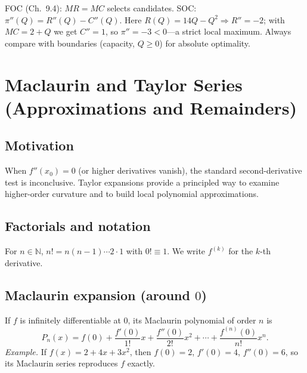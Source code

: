 \documentclass[12pt]{article}
\theoremstyle{definition}
\begin{document}
\begin{tcolorbox}[sidebyside, righthand width=0.42\textwidth, title=\textbf{MR–MC Geometry}]
\begin{minipage}{0.56\textwidth}
\end{minipage}
\tcblower
FOC (Ch.\ 9.4): $MR=MC$ selects candidates.  
SOC: $\pi''(Q)=R''(Q)-C''(Q)$. Here $R(Q)=14Q-Q^2\Rightarrow R''=-2$; with $MC=2+Q$ we get $C''=1$, so $\pi''=-3<0$—a strict local maximum.  
Always compare with boundaries (capacity, $Q\ge0$) for absolute optimality.
\end{tcolorbox}


\section{Maclaurin and Taylor Series (Approximations and Remainders)}
\subsection*{Motivation}
When $f''(x_0)=0$ (or higher derivatives vanish), the standard second-derivative test is inconclusive. Taylor expansions provide a principled way to examine higher-order curvature and to build local polynomial approximations.

\subsection*{Factorials and notation}
For $n\in\mathbb{N}$, $n!=n(n-1)\cdots 2\cdot1$ with $0!\equiv1$. We write $f^{(k)}$ for the $k$-th derivative.

\subsection*{Maclaurin expansion (around $0$)}
If $f$ is infinitely differentiable at $0$, its Maclaurin polynomial of order $n$ is
\[
P_n(x)= f(0)+\frac{f'(0)}{1!}x+\frac{f''(0)}{2!}x^2+\cdots+\frac{f^{(n)}(0)}{n!}x^n.
\]
\emph{Example.} If $f(x)=2+4x+3x^2$, then $f(0)=2$, $f'(0)=4$, $f''(0)=6$, so its Maclaurin series reproduces $f$ exactly.
\end{document}
